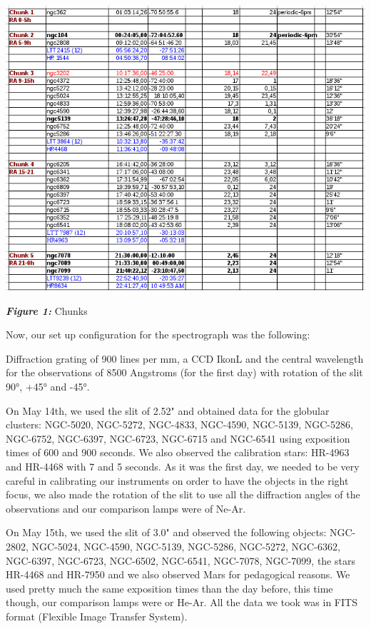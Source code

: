 \begin{center}
\includegraphics[scale=0.5]{9.png}

\textit{\textbf{Figure 1:}} Chunks
\end{center}

Now, our set up configuration for the spectrograph was the following:

Diffraction grating of 900 lines per mm, a CCD IkonL and the central wavelength for the observations of 8500 Angstroms (for the first day) with rotation of the slit 90°, +45° and -45°.

On May 14th, we used the slit of 2.52" and obtained data for the globular clusters: NGC-5020, NGC-5272, NGC-4833, NGC-4590, NGC-5139, NGC-5286, NGC-6752, NGC-6397, NGC-6723, NGC-6715 and NGC-6541 using exposition times of 600 and 900 seconds. We also observed the calibration stars: HR-4963 and HR-4468 with 7 and 5 seconds. As it was the first day, we needed to be very careful in calibrating our instruments on order to have the objects in the right focus, we also made the rotation of the slit to use all the diffraction angles of the observations and our comparison lamps were of Ne-Ar.

On May 15th, we used the slit of 3.0" and observed the following objects: NGC-2802, NGC-5024, NGC-4590, NGC-5139, NGC-5286, NGC-5272, NGC-6362, NGC-6397, NGC-6723, NGC-6502, NGC-6541, NGC-7078, NGC-7099, the stars HR-4468 and HR-7950 and we also observed Mars for pedagogical reasons. We used pretty much the same exposition times than the day before, this time though, our comparison lamps were or He-Ar. All the data we took was in FITS format (Flexible Image Transfer System).

